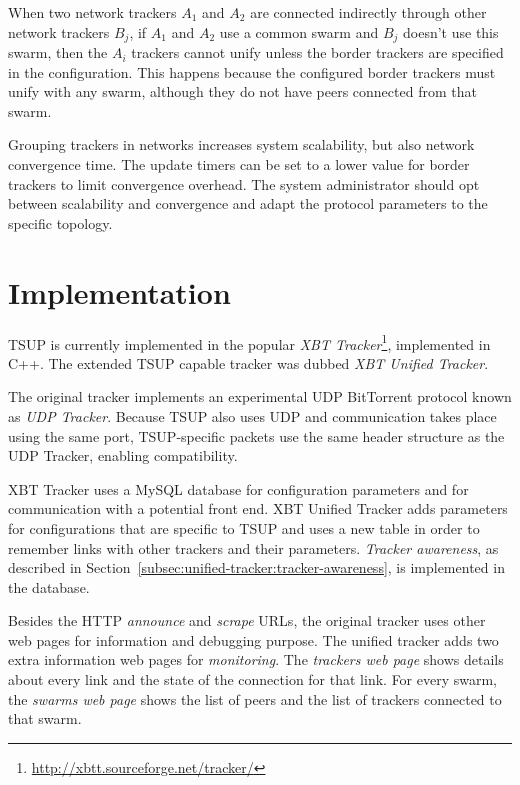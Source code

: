 When two network trackers $A_{1}$ and $A_{2}$ are connected indirectly through
other network trackers $B_{j}$, if $A_{1}$ and $A_{2}$ use a common swarm and
$B_{j}$ doesn't use this swarm, then the $A_{i}$ trackers cannot unify unless
the border trackers are specified in the configuration. This happens because
the configured border trackers must unify with any swarm, although they do not
have peers connected from that swarm.

Grouping trackers in networks increases system scalability, but also network
convergence time. The update timers can be set to a lower value for border
trackers to limit convergence overhead.  The system administrator should opt
between scalability and convergence and adapt the protocol parameters to the
specific topology.

\section{Implementation}
\label{sec:unified-tracker:implementation}

TSUP is currently implemented in the popular \textit{XBT
Tracker}\footnote{\url{http://xbtt.sourceforge.net/tracker/}}, implemented in C++.
The extended TSUP capable tracker was dubbed \textit{XBT Unified Tracker}.

The original tracker implements an experimental UDP BitTorrent protocol
known as \textit{UDP Tracker}. Because TSUP also uses UDP and communication
takes place using the same port, TSUP-specific packets use the same header
structure as the UDP Tracker, enabling compatibility.

XBT Tracker uses a MySQL database for configuration parameters and for
communication with a potential front end. XBT Unified Tracker adds parameters
for configurations that are specific to TSUP and uses a new table in order to
remember links with other trackers and their parameters.  \textit{Tracker
awareness}, as described in
Section~\ref{subsec:unified-tracker:tracker-awareness}, is implemented in the
database.

Besides the HTTP \textit{announce} and \textit{scrape} URLs, the original
tracker uses other web pages for information and debugging purpose. The
unified tracker adds two extra information web pages for \textit{monitoring}.
The \textit{trackers web page} shows details about every link and the state of
the connection for that link. For every swarm, the \textit{swarms web page}
shows the list of peers and the list of trackers connected to that swarm.


